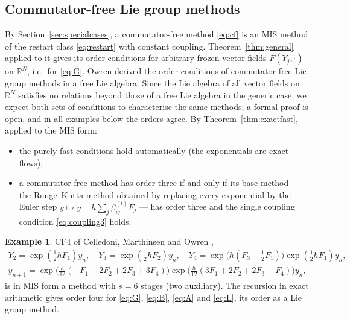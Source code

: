 \documentclass[11pt,a4paper]{article}
\theoremstyle{definition}
\newtheorem{example}[theorem]{Example}
\theoremstyle{remark}
\newcommand{\R}{\mathbb{R}}
\begin{document}
\subsection{Commutator-free Lie group methods}
\label{sec:cf}

By Section~\ref{sec:specialcases}, a commutator-free method \eqref{eq:cf} is an MIS method of the restart class
\eqref{eq:restart} with constant coupling. Theorem~\ref{thm:general} applied to it gives its order conditions for
arbitrary frozen vector fields $F(Y_j,\cdot)$ on $\R^N$, i.e.\ for \eqref{eq:G}. Owren \cite{Owren2006} derived the order
conditions of commutator-free Lie group methods in a free Lie algebra. Since the Lie algebra of all vector fields on
$\R^N$ satisfies no relations beyond those of a free Lie algebra in the generic case, we expect both sets of conditions to
characterise the same methods; a formal proof is open, and in all examples below the orders agree. By
Theorem~\ref{thm:exactfast}, applied to the MIS form:
\begin{itemize}
\item the purely fast conditions hold automatically (the exponentials are exact flows);
\item a commutator-free method has order three if and only if its base method --- the Runge--Kutta method obtained by
  replacing every exponential by the Euler step $y\mapsto y+h\sum_j\beta^{(l)}_{ij}F_j$ --- has order three and the single
  coupling condition \eqref{eq:coupling3} holds.
\end{itemize}

\begin{example}
CF4 of Celledoni, Marthinsen and Owren \cite{CelledoniMarthinsenOwren2003},
\begin{gather*}
 Y_2=\exp(\tfrac12hF_1)y_n,\quad Y_3=\exp(\tfrac12hF_2)y_n,\quad Y_4=\exp\big(h(F_3-\tfrac12F_1)\big)\exp(\tfrac12hF_1)y_n,\\
 y_{n+1}=\exp\big(\tfrac h{12}(-F_1+2F_2+2F_3+3F_4)\big)\exp\big(\tfrac h{12}(3F_1+2F_2+2F_3-F_4)\big)y_n,
\end{gather*}
is in MIS form a method with $s=6$ stages (two auxiliary). The recursion in exact arithmetic gives order four for
\eqref{eq:G}, \eqref{eq:B}, \eqref{eq:A} and \eqref{eq:L}, its order as a Lie group method.
\end{example}
\end{document}
